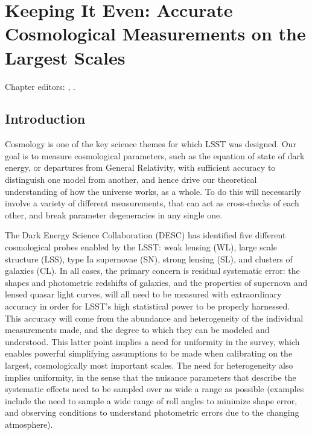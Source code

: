 
\chapter[Cosmology]{Keeping It Even: Accurate Cosmological Measurements on the Largest Scales}
\def\chpname{cosmo}\label{chp:\chpname}

Chapter editors:
,
.


\section{Introduction}
\label{sec:\chpname:intro}


Cosmology is one of the key science themes for which LSST was
designed. Our goal is to measure cosmological parameters, such as the
equation of state of dark energy, or departures from General
Relativity, with sufficient accuracy to distinguish one model from
another, and hence drive our theoretical understanding of how the
universe works, as a whole. To do this will necessarily involve a
variety of different measurements, that can act as cross-checks of
each other, and break parameter degeneracies in any single one.

The  Dark Energy Science Collaboration (DESC) has identified five
different cosmological probes enabled by the LSST: weak lensing (WL),
large scale structure (LSS), type Ia supernovae (SN), strong lensing
(SL), and clusters of galaxies (CL). In all cases, the primary concern
is residual systematic error: the shapes and photometric redshifts of
galaxies, and the properties of supernova and lensed quasar light
curves, will all need to be measured with extraordinary accuracy in order for LSST's high statistical power to be properly harnessed. This accuracy will come from the abundance and heterogeneity of the individual measurements made, and the degree to which they can be modeled and understood. This latter point implies a need for uniformity in the survey, which enables powerful simplifying assumptions to be made when calibrating on the largest, cosmologically most important scales. The need for heterogeneity also implies  uniformity, in the sense that the nuisance parameters that describe the systematic effects need to be sampled over as wide a range as possible (examples include the need to sample a wide range of roll angles to minimize shape error, and observing conditions to understand photometric errors due to the changing atmosphere).


